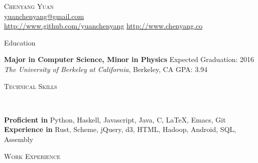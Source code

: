 \documentclass[9pt]{article}
\newenvironment{changemargin}[2]{%
  \begin{list}{}{%
      \setlength{\topsep}{0pt}%
      \setlength{\leftmargin}{#1}%
      \setlength{\rightmargin}{#2}%
      \setlength{\listparindent}{\parindent}%
      \setlength{\itemindent}{\parindent}%
      \setlength{\parsep}{\parskip}%
    }%
  \item[]}{\end{list}
}
\newcommand{\lineover}{
  \begin{changemargin}{-0.05in}{-0.05in}
    \vspace*{-8pt}
    \hrulefill \\
    \vspace*{-2pt}
  \end{changemargin}
}
\newcommand{\header}[1]{
  \begin{changemargin}{-0.5in}{-0.5in}
    \scshape{#1}\\
    \lineover
  \end{changemargin}
}
\newcommand{\contact}[4]{
  \begin{changemargin}{-0.5in}{-0.5in}
    \begin{center}
      {\Large \scshape {#1}}\\ \smallskip
      {#2}\\ \smallskip
      {#3}\\ \smallskip
      {#4}\smallskip
    \end{center}
  \end{changemargin}
}
\newenvironment{body} {
  \vspace*{-16pt}
  \begin{changemargin}{-0.25in}{-0.5in}
  }
  {\end{changemargin}
}
\begin{document}
\contact{Chenyang Yuan}{\href{mailto:yuanchenyang@gmail.com}{yuanchenyang@gmail.com}}{ \url{http://www.github.com/yuanchenyang} \quad \url{http://www.chenyang.co}}

\header{Education}

\begin{body}
  \vspace{14pt}
  \textbf{Major in Computer Science, Minor in Physics} \hfill Expected Graduation: 2016 \\
  \emph{The University of Berkeley at California}, Berkeley, CA{} \hfill GPA: 3.94 \\
\end{body}

\smallskip

\header{Technical Skills}

\begin{body}
  \vspace{14pt}
  \textbf{Proficient in} Python, Haskell, Javascript, Java,  C, \LaTeX, Emacs, Git \\
  \textbf{Experience in} Rust, Scheme, jQuery, d3, HTML, Hadoop, Android, SQL, Assembly
\end{body}

\smallskip



\header{Work Experience}
\end{document}

